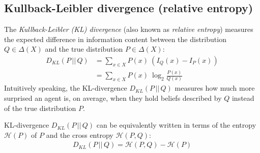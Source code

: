 \documentclass[nobib,nofonts]{tufte-handout}
\begin{document}
\subsection{Kullback-Leibler divergence (relative entropy)}

The \emph{Kullback-Leibler (KL) divergence} (also known as \emph{relative entropy}) measures the expected difference in information content between the distribution $Q \in \Delta(X)$ and the true distribution $P \in \Delta(X)$:
\begin{align*}
  D_{KL}(P \,||\, Q) & = \sum_{x \in X} P(x) \ \left ( I_{Q}(x) - I_{P}(x) \right ) \\
  & = \sum_{x \in X} P(x) \ \log_{2}  \frac{P(x)}{Q(x)}
\end{align*}
Intuitively speaking, the KL-divergence $D_{KL}(P \,||\, Q)$ measures how much more surprised an agent is, on average, when they hold beliefs described by $Q$ instead of the true distribution $P$.

KL-divergence $D_{KL}(P \,||\, Q)$ can be equivalently written in terms of the entropy $\mathcal{H}(P)$ of $P$ and the cross entropy $\mathcal{H}(P,Q)$:
\begin{align*}
  D_{KL}(P \,||\, Q) = \mathcal{H}(P,Q) - \mathcal{H}(P)
\end{align*}
\end{document}
